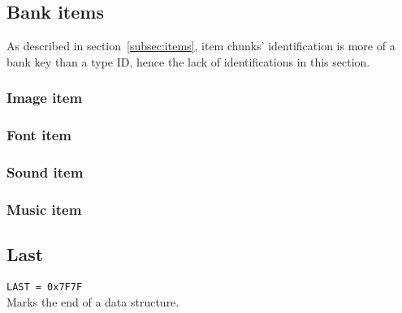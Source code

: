 \documentclass{article}
\begin{document}
\subsection{Bank items}

As described in section~\ref{subsec:items}, item chunks' identification is more
of a bank key than a type ID, hence the lack of identifications in this
section.

\subsubsection{Image item}

\subsubsection{Font item}

\subsubsection{Sound item}

\subsubsection{Music item}

\subsection{Last}
\verb|LAST = 0x7F7F|
\\
Marks the end of a data structure.
\end{document}
